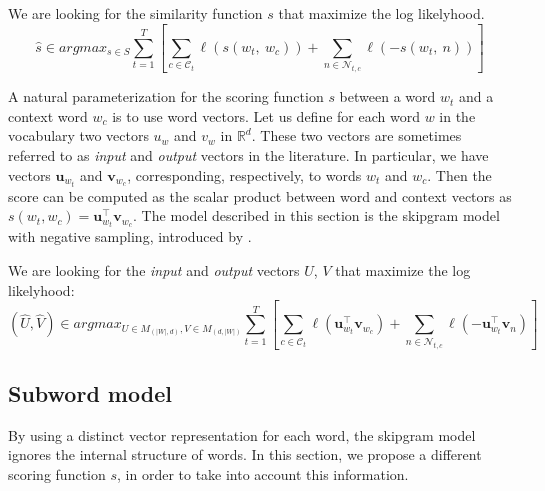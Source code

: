 We are looking for the similarity function $s$ that maximize the log likelyhood.
\begin{equation*}
  \hat s \in argmax_{s\in S} \sum_{t=1}^{T}  \left [ \sum_{c \in \mathcal{C}_t} \ell(s(w_t,\ w_c)) + \sum_{n \in \mathcal{N}_{t,c}} \ell(-s(w_t,\ n)) \right ]
\end{equation*}




A natural parameterization for the scoring function $s$ between a word $w_t$ and a context word $w_c$ is to use word vectors.
Let us define for each word $w$ in the vocabulary two vectors $u_w$ and $v_w$ in $\mathbb{R}^d$.
These two vectors are sometimes referred to as \emph{input} and \emph{output} vectors in the literature.
In particular, we have vectors $\mathbf{u}_{w_t}$ and $\mathbf{v}_{w_c}$, corresponding, respectively, to words $w_t$ and $w_c$.
Then the score can be computed as the scalar product between word and context vectors as $s(w_t, w_c) = \mathbf{u}_{w_t}^{\top} \mathbf{v}_{w_c}$.
The model described in this section is the skipgram model with negative sampling, introduced by .

We are looking for the \emph{input} and \emph{output} vectors $U$, $V$ that maximize the log likelyhood:
\begin{equation*}
  (\hat U, \hat V) \in argmax_{U \in M_{(|W|, d)}, V \in M_{(d, |W|)} } \sum_{t=1}^{T}  \left [ \sum_{c \in \mathcal{C}_t} \ell(\mathbf{u}_{w_t}^{\top} \mathbf{v}_{w_c}) + \sum_{n \in \mathcal{N}_{t,c}} \ell(-\mathbf{u}_{w_t}^{\top} \mathbf{v}_{n}) \right ]
\end{equation*}


\subsection{Subword model}
\label{sec:model-ngrams}

By using a distinct vector representation for each word, the skipgram model ignores the internal structure of words.
In this section, we propose a different scoring function $s$, in order to take into account this information.

